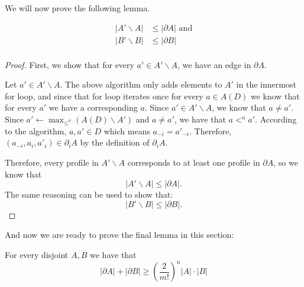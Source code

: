 	We will now prove the following lemma.
	\begin{lemma}
		\label{lemma-8-enough-edges}
		\begin{align*}
			|A' \backslash A| &\le |\partial A| \textrm{ and} \\
			|B' \backslash B| &\le |\partial B| \\
		\end{align*}
	\end{lemma}

	\begin{proof}
		First, we show that for every $a' \in A' \backslash A$, we have an edge in $\partial A$.

		Let $a' \in A' \backslash A$. The above algorithm only adds elements to $A'$ in the innermost for loop, and since that for loop iterates once for every $a \in A(D)$ we know that for every $a'$ we have a corresponding $a$. Since $a' \in A' \backslash A$, we know that $a \ne a'$. Since $a' \gets \max_{\le^n}(A(D) \backslash A')$ and $a \ne a'$, we have that $a <^n a'$. According to the algorithm, $a, a' \in D$ which means $a_{-i} = a'_{-i}$. Therefore, $(a_{-i}, a_i, a'_i) \in \partial_i A$ by the definition of $\partial_i A$.

		Therefore, every profile in $A' \backslash A$ corresponds to at least one profile in $\partial A$, so we know that
		\[
			|A' \backslash A| \le |\partial A|.
		\]
		The same reasoning can be used to show that:
		\[
			|B' \backslash B| \le |\partial B|.
		\]
	\end{proof}

	And now we are ready to prove the final lemma in this section:

	\begin{lemma}
		\label{friedgut-lemma-8}
		For every disjoint $A, B$ we have that
		\[
			|\partial A| + |\partial B| \ge \left( \frac{2}{m!} \right)^n |A| \cdot |B|
		\]
	\end{lemma}

